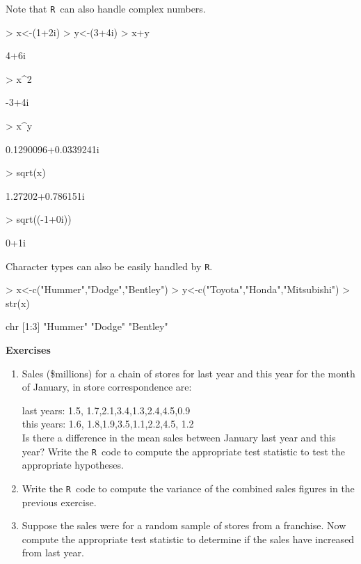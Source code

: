 \documentclass[12pt,A4,makeidx]{article}
\newcommand{\tR}{\texttt{R}}
\begin{document}
Note that \tR \ can also handle complex numbers.
\begin{Schunk}
\begin{Sinput}
> x<-(1+2i)
> y<-(3+4i)
> x+y
\end{Sinput}
\begin{Soutput}
[1] 4+6i
\end{Soutput}
\begin{Sinput}
> x^2
\end{Sinput}
\begin{Soutput}
[1] -3+4i
\end{Soutput}
\begin{Sinput}
> x^y
\end{Sinput}
\begin{Soutput}
[1] 0.1290096+0.0339241i
\end{Soutput}
\begin{Sinput}
> sqrt(x)
\end{Sinput}
\begin{Soutput}
[1] 1.27202+0.786151i
\end{Soutput}
\begin{Sinput}
> sqrt((-1+0i))
\end{Sinput}
\begin{Soutput}
[1] 0+1i
\end{Soutput}
\end{Schunk}

Character types can also be easily handled by \tR.
\begin{Schunk}
\begin{Sinput}
> x<-c("Hummer","Dodge","Bentley")
> y<-c("Toyota","Honda","Mitsubishi")
> str(x)
\end{Sinput}
\begin{Soutput}
 chr [1:3] "Hummer" "Dodge" "Bentley"
\end{Soutput}
\end{Schunk}

\vspace{0.5in}
{\bf Exercises}
\begin{enumerate}
\item Sales (\$millions)
for a chain of stores for last year and this year 
for the month of January, in store correspondence are:

last years: 1.5, 1.7,2.1,3.4,1.3,2.4,4.5,0.9\\
this years: 1.6, 1.8,1.9,3.5,1.1,2.2,4.5, 1.2\\

Is there a difference in the mean sales between January last year and this year? Write the \tR \ code to compute
the appropriate test statistic to test the appropriate hypotheses.
\item Write the \tR \ code to compute the variance of the combined sales figures in the previous exercise.
\item Suppose the sales were for a random sample of stores from a franchise. Now compute the appropriate test
statistic to determine if the sales have increased from last year.
\end{enumerate}
\end{document}
